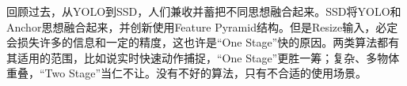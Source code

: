 回顾过去，从YOLO到SSD，人们兼收并蓄把不同思想融合起来。SSD将YOLO和Anchor思想融合起来，并创新使用Feature Pyramid结构。但是Resize输入，必定会损失许多的信息和一定的精度，这也许是“One Stage”快的原因。两类算法都有其适用的范围，比如说实时快速动作捕捉，“One Stage”更胜一筹；复杂、多物体重叠，“Two Stage”当仁不让。没有不好的算法，只有不合适的使用场景。